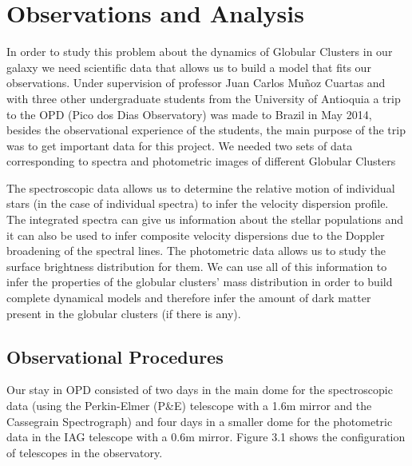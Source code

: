 
\chapter{Observations and Analysis}

In order to study this problem about the dynamics of Globular Clusters in our galaxy we need scientific data that allows us to build a model that fits our observations. Under supervision of professor Juan Carlos Mu\~noz Cuartas and with three other undergraduate students from the University of Antioquia a trip to the OPD (Pico dos Dias Observatory) was made to Brazil in May 2014, besides the observational experience of the students, the main purpose of the trip was to get important data for this project. We needed two sets of data corresponding to spectra and photometric images of different Globular Clusters

The spectroscopic data allows us to determine the relative motion of individual stars (in the case of individual spectra) to infer the velocity dispersion profile. The integrated spectra can give us information about the stellar populations and it can also be used to infer composite velocity dispersions due to the Doppler broadening of the spectral lines. The photometric data allows us to study the surface brightness distribution for them. We can use all of this information to infer the properties of the globular clusters' mass distribution in order to build complete dynamical models and therefore infer the amount of dark matter present in the globular clusters (if there is any).

\section{Observational Procedures}

Our stay in OPD consisted of two days in the main dome for the spectroscopic data (using the Perkin-Elmer (P\&E) telescope with a 1.6m mirror and the Cassegrain Spectrograph) and four days in a smaller dome for the photometric data in the IAG telescope with a 0.6m mirror. Figure 3.1 shows the configuration of telescopes in the observatory.

